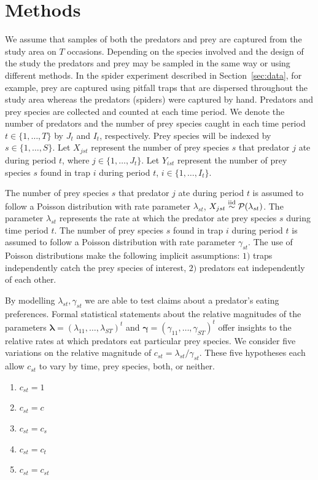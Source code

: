\documentclass[smallextended]{svjour3}
\begin{document}
\section{Methods}
\label{sec:methods}

We assume that samples of both the predators and prey are captured from the study area on $T$ occasions.  Depending on the species involved and the design of the study the predators and prey may be sampled in the same way or using different methods.  In the spider experiment described in Section~\ref{sec:data}, for example, prey are captured using pitfall traps that are dispersed throughout the study area whereas the predators (spiders) were captured by hand.  Predators and prey species are collected and counted at each time period.  We denote the number of predators and the number of prey species caught in each time period $t \in \{1, \ldots, T\}$ by $J_t$ and $I_t$, respectively.  Prey species will be indexed by $s \in \{1, \ldots, S \}$.  Let $X_{jst}$ represent the number of prey species $s$ that predator $j$ ate during period $t$, where $j \in \{1, \ldots, J_t\}$.  Let $Y_{ist}$ represent the number of prey species $s$ found in trap $i$ during period $t$, $i \in \{1, \ldots, I_t\}$.

The number of prey species $s$ that predator $j$ ate during period $t$ is assumed to follow a Poisson distribution with rate parameter $\lambda_{st}$, $X_{jst} \stackrel{\mathrm{iid}}{\sim} \mathcal{P}(\lambda_{st})$.  The parameter $\lambda_{st}$ represents the rate at which the predator ate prey species $s$ during time period $t$.  The number of prey species $s$ found in trap $i$ during period $t$ is assumed to follow a Poisson distribution with rate parameter $\gamma_{st}$.  The use of Poisson distributions make the following implicit assumptions: $1)$ traps independently catch the prey species of interest, $2)$ predators eat independently of each other.  

By modelling $\lambda_{st}, \gamma_{st}$ we are able to test claims about a predator's eating preferences.  Formal statistical statements about the relative magnitudes of the parameters $\boldsymbol{\lambda} = (\lambda_{11}, \ldots, \lambda_{ST})^t$ and $\boldsymbol{\gamma} = (\gamma_{11}, \ldots, \gamma_{ST})^t$ offer insights to the relative rates at which predators eat particular prey species.  We consider five variations on the relative magnitude of $c_{st} = \lambda_{st}/\gamma_{st}$.  These five hypotheses each allow $c_{st}$ to vary by time, prey species, both, or neither.

\begin{enumerate}
\item $c_{st} = 1$
\item $c_{st} = c$
\item $c_{st} = c_s$
\item $c_{st} = c_t$
\item $c_{st} = c_{st}$
\end{enumerate}
\end{document}
